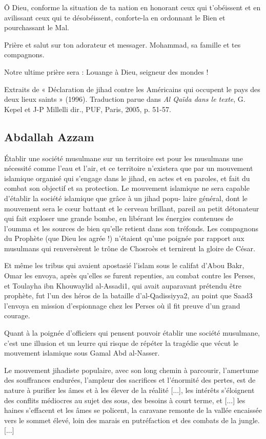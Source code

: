 Ô Dieu, conforme la situation de ta nation en honorant ceux qui
t'obéissent et en avilissant ceux qui te désobéissent, conforte-la en
ordonnant le Bien et pourchassant le Mal.

Prière et salut sur ton adorateur et messager. Mohammad, sa famille et
tes compagnons.

Notre ultime prière sera : Louange à Dieu, seigneur des mondes !

Extraits de « Déclaration de jihad contre les Américains qui occupent le
pays des deux lieux saints » (1996). Traduction parue dans \emph{Al
Qaïda dans le texte}, G. Kepel et J-P Millelli dir., PUF, Paris, 2005,
p. 51-57.


\hypertarget{abdallah-azzam}{%
\subsection{Abdallah Azzam}\label{abdallah-azzam}}

 
Établir une société musulmane sur un territoire est pour les musulmans
une nécessité comme l'eau et l'air, et ce territoire n'existera que par
un mouvement islamique organisé qui s'engage dans le jihad, en actes et
en paroles, et fait du combat son objectif et sa protection. Le
mouvement islamique ne sera capable d'établir la société islamique que
grâce à un jihad popu- laire général, dont le mouvement sera le cœur
battant et le cerveau brillant, pareil au petit détonateur qui fait
exploser une grande bombe, en libérant les énergies contenues de l'oumma
et les sources de bien qu'elle retient dans son tréfonds. Les compagnons
du Prophète (que Dieu les agrée !) n'étaient qu'une poignée par rapport
aux musulmans qui renversèrent le trône de Chosroès et ternirent la
gloire de César.

Et même les tribus qui avaient apostasié l'islam sous le califat d'Abou
Bakr, Omar les envoya, après qu'elles se furent repenties, au combat
contre les Perses, et Toulayha ibn Khouwaylid al-Assadi1, qui avait
auparavant prétendu être prophète, fut l'un des héros de la bataille
d'al-Qadissiyya2, au point que Saad3 l'envoya en mission d'espionnage
chez les Perses où il fit preuve d'un grand courage.

Quant à la poignée d'officiers qui pensent pouvoir établir une société
musulmane, c'est une illusion et un leurre qui risque de répéter la
tragédie que vécut le mouvement islamique sous Gamal Abd al-Nasser.

Le mouvement jihadiste populaire, avec son long chemin à parcourir,
l'amertume des souffrances endurées, l'ampleur des sacrifices et
l'énormité des pertes, est de nature à purifier les âmes et à les élever
de la réalité {[}...{]}, les intérêts s'éloignent des conflits médiocres
au sujet des sous, des besoins à court terme, et {[}...{]} les haines
s'effacent et les âmes se policent, la caravane remonte de la vallée
encaissée vers le sommet élevé, loin des marais en putréfaction et des
combats de la jungle. {[}...{]}

